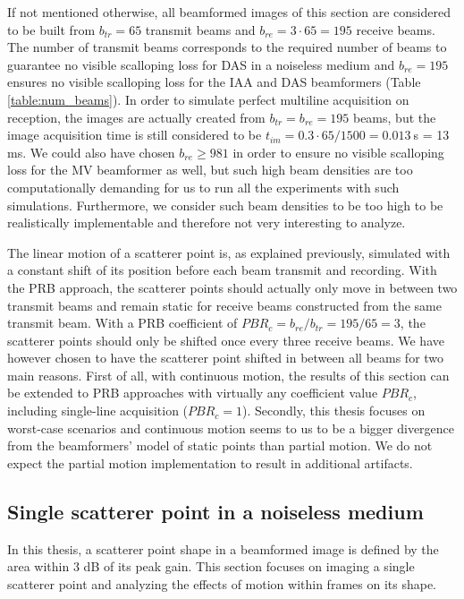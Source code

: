 If not mentioned otherwise, all beamformed images of this section are considered to be built from $b_{tr} = 65$ transmit beams and $b_{re} = 3 \cdot 65 = 195$ receive beams. The number of transmit beams corresponds to the required number of beams to guarantee no visible scalloping loss for DAS in a noiseless medium and $b_{re} = 195$ ensures no visible scalloping loss for the IAA and DAS beamformers (Table \ref{table:num_beams}).
In order to simulate perfect multiline acquisition on reception, the images are actually created from $b_{tr} = b_{re} = 195$ beams, but the image acquisition time is still considered to be $t_{im} = 0.3 \cdot 65 / 1500 = 0.013~$s = 13 ms.
We could also have chosen $b_{re} \geq 981$ in order to ensure no visible scalloping loss for the MV beamformer as well, but 
such high beam densities are too computationally demanding for us to run all the experiments with such simulations.
Furthermore, we consider such beam densities to be too high to be realistically implementable and therefore not very interesting to analyze.

The linear motion of a scatterer point is, as explained previously, simulated with a constant shift of its position before each beam transmit and recording. With the PRB approach, the scatterer points should actually only move in between two transmit beams and remain static for receive beams constructed from the same transmit beam. With a PRB coefficient of $PBR_c = b_{re} / b_{tr} = 195 / 65 = 3$, the scatterer points should only be shifted once every three receive beams.
We have however chosen to have the scatterer point shifted in between all beams for two main reasons.
First of all, with continuous motion, the results of this section can be extended to PRB approaches with virtually any coefficient value $PBR_c$, including single-line acquisition ($PBR_c = 1$). Secondly, this thesis focuses on worst-case scenarios and continuous motion seems to us to be a bigger divergence from the beamformers' model of static points than partial motion. We do not expect the partial motion implementation to result in additional artifacts.


\subsection{Single scatterer point in a noiseless medium}
\label{sec:single_noiseless}
In this thesis, a scatterer point shape in a beamformed image is defined by the area within 3 dB of its peak gain. This section focuses on imaging a single scatterer point and analyzing the effects of motion within frames on its shape.

